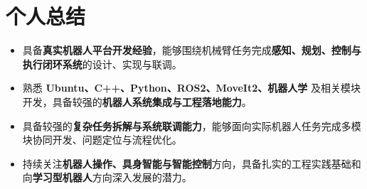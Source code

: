 \documentclass{resume}
\begin{document}
\section{\textcolor{myblue}{个人总结}}

\begin{itemize}
  \item 具备\textbf{真实机器人平台开发经验}，能够围绕机械臂任务完成\textbf{感知、规划、控制与执行闭环系统}的设计、实现与联调。
  \item 熟悉 \textbf{Ubuntu、C++、Python、ROS2、MoveIt2、机器人学} 及相关模块开发，具备较强的\textbf{机器人系统集成与工程落地能力}。
  \item 具备较强的\textbf{复杂任务拆解与系统联调能力}，能够面向实际机器人任务完成多模块协同开发、问题定位与流程优化。
  \item 持续关注\textbf{机器人操作、具身智能与智能控制}方向，具备扎实的工程实践基础和向\textbf{学习型机器人}方向深入发展的潜力。
\end{itemize}
\end{document}
